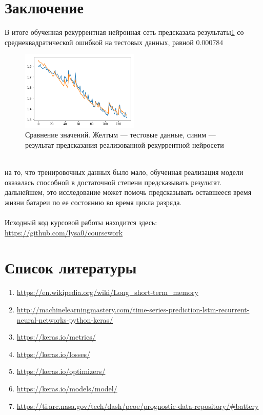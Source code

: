 \documentclass[russian,english,18pt,a4paper,reqno,dviphfm]{article}
\begin{document}
\section{Заключение}
В итоге обученная рекуррентная нейронная сеть предсказала результаты\ref{fig:3} со среднеквадратической ошибкой на тестовых данных, равной $0.000784$
\begin{figure}[h!]
	\center
	\includegraphics[width=0.5\textwidth]{pic/model.png}
	\caption{Сравнение значений. Желтым --- тестовые данные, синим --- результат предсказания реализованной рекуррентной нейросети} 
	\label{fig:3}
\end{figure}\\
 на то, что тренировочных данных было мало, обученная реализация модели оказалась способной в достаточной степени предсказывать результат.\\
 дальнейшем, это исследование может помочь предсказывать оставшееся время жизни батареи по ее состоянию во время цикла разряда.\\\\
Исходный код курсовой работы находится здесь: \href{https://github.com/lysa0/coursework}{https://github.com/lysa0/coursework}

\newpage
\pagestyle{plain}
\section*{Список литературы}
\begin{enumerate}
	\item \href{https://en.wikipedia.org/wiki/Long\_short-term\_memory}{https://en.wikipedia.org/wiki/Long\_short-term\_memory}
	\item \href{http://machinelearningmastery.com/time-series-prediction-lstm-recurrent-neural-networks-python-keras/}{http://machinelearningmastery.com/time-series-prediction-lstm-recurrent-neural-networks-python-keras/}
	\item \href{https://keras.io/metrics/}{https://keras.io/metrics/}
	\item \href{https://keras.io/losses/}{https://keras.io/losses/}
	\item \href{https://keras.io/optimizers/}{https://keras.io/optimizers/}
	\item \href{https://keras.io/models/model/}{https://keras.io/models/model/}
	\item \href{https://ti.arc.nasa.gov/tech/dash/pcoe/prognostic-data-repository/\#battery}{https://ti.arc.nasa.gov/tech/dash/pcoe/prognostic-data-repository/\#battery}
\end{enumerate}
\end{document}
